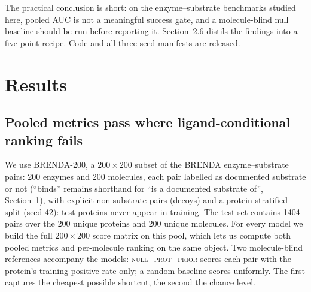 \documentclass[11pt,a4paper]{article}
\newcommand{\nullprior}{\textsc{null\_prot\_prior}\xspace}
\begin{document}
The practical conclusion is short: on the enzyme--substrate benchmarks
studied here, pooled AUC is
not a meaningful success gate, and a molecule-blind null baseline should be
run before reporting it. Section~2.6 distils the findings into a five-point
recipe. Code and all three-seed manifests are released.

\section{Results}
\label{sec:results}

\subsection{Pooled metrics pass where ligand-conditional ranking fails}
\label{sec:shortcut}

We use BRENDA-200, a $200\times200$ subset of the BRENDA enzyme--substrate
pairs: 200 enzymes and 200 molecules, each pair labelled as documented
substrate or not (``binds'' remains shorthand for ``is a documented
substrate of'', Section~1), with explicit non-substrate pairs (decoys) and a
protein-stratified split (seed 42): test proteins never appear in training.
The test set contains 1404 pairs over the 200 unique proteins and 200 unique
molecules. For every model we build the full $200 \times 200$ score matrix on
this pool, which lets us compute both pooled metrics and per-molecule
ranking on the same object. Two molecule-blind references accompany the
models: \nullprior{} scores each pair with the protein's training positive
rate only; a random baseline scores uniformly. The first captures the
cheapest possible shortcut, the second the chance level.
\end{document}
